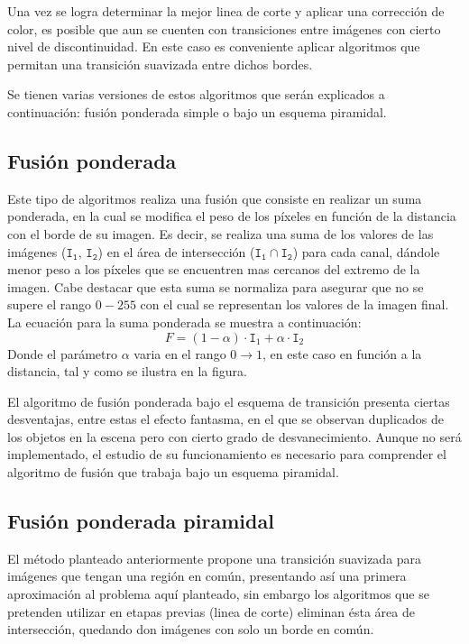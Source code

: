 Una vez se logra determinar la mejor linea de corte y aplicar una corrección de color, es posible que aun se cuenten con transiciones entre imágenes con cierto nivel de discontinuidad. En este caso es conveniente aplicar algoritmos que permitan una transición suavizada entre dichos bordes.

Se tienen varias versiones de estos algoritmos que serán explicados a continuación: fusión ponderada simple o bajo un esquema piramidal.

\subsection{Fusión ponderada} \label{feathering}
Este tipo de algoritmos realiza una fusión que consiste en realizar un suma ponderada, en la cual se modifica el peso de los píxeles en función de la distancia con el borde de su imagen. Es decir, se realiza una suma de los valores de las imágenes ($\mathtt{I_1},\, \mathtt{I_2}$) en el área de intersección ($\mathtt{I_1}\cap \mathtt{I_2}$) para cada canal, dándole menor peso a los píxeles que se encuentren mas cercanos del extremo de la imagen. Cabe destacar que esta suma se normaliza para asegurar que no se supere el rango $0-255$ con el cual se representan los valores de la imagen final. La ecuación para la suma ponderada se muestra a continuación:
\begin{displaymath}
	F = (1-\alpha)\cdot \mathtt{I}_1 + \alpha\cdot \mathtt{I}_2
\end{displaymath} 
Donde el parámetro $\alpha$ varia en el rango $0\to 1$, en este caso en función a la distancia, tal y como se ilustra en la figura.




El algoritmo de fusión ponderada bajo el esquema de transición presenta ciertas desventajas, entre estas el efecto fantasma, en el que se observan duplicados de los objetos en la escena pero con cierto grado de desvanecimiento. Aunque no será implementado, el estudio de su funcionamiento es necesario para comprender el algoritmo de fusión que trabaja bajo un esquema piramidal.

\subsection{Fusión ponderada piramidal}

El método planteado anteriormente propone una transición suavizada para imágenes que tengan una región en común, presentando así una primera aproximación al problema aquí planteado, sin embargo los algoritmos que se pretenden utilizar en etapas previas (linea de corte) eliminan ésta área de intersección, quedando don imágenes con solo un borde en común. 

